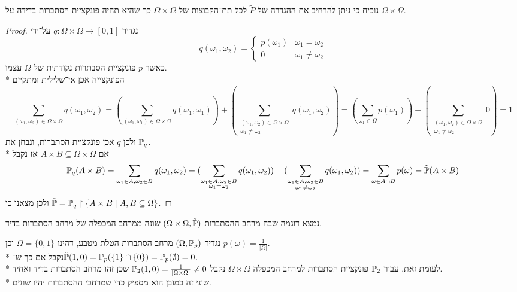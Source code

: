 \Subquestion{}
נוכיח כי ניתן להרחיב את ההגדרה של $\tilde{P}$ לכל תת־הקבוצות של $\Omega \times \Omega$ כך שהיא תהיה פונקציית הסתברות בדידה על $\Omega \times \Omega$.
\begin{proof}
	נגדיר $q : \Omega \times \Omega \to [0, 1]$ על־ידי
	\[
		q(\omega_1, \omega_2) = \begin{cases}
			p(\omega_1) & \omega_1 = \omega_2 \\
			0 & \omega_1 \ne \omega_2
		\end{cases}
	\]
	כאשר $p$ פונקציית הסבתרות נקודתית של $\Omega$ עצמו. \\*
	הפונקצייה אכן אי־שלילית ומתקיים
	\[
		\sum_{(\omega_1, \omega_2) \in \Omega \times \Omega} q(\omega_1, \omega_2)
		= (\sum_{(\omega_1, \omega_1) \in \Omega \times \Omega} q(\omega_1, \omega_1)) + (\sum_{\substack{(\omega_1, \omega_2) \in \Omega \times \Omega \\ \omega_1 \ne \omega_2}} q(\omega_1, \omega_2))
		= (\sum_{\omega_1 \in \Omega} p(\omega_1)) + (\sum_{\substack{(\omega_1, \omega_2) \in \Omega \times \Omega \\ \omega_1 \ne \omega_2}} 0)
		= 1
	\]
	ולכן $q$ אכן פונקציית הסתברות, ונבחן את $\mathbb{P}_q$. \\*
	אם $A \times B \subseteq \Omega \times \Omega$ אז נקבל
	\[
		\mathbb{P}_q(A \times B)
		= \sum_{\omega_1 \in A, \omega_2 \in B} q(\omega_1, \omega_2)
		= (\sum_{\substack{\omega_1 \in A, \omega_2 \in B \\ \omega_1 = \omega_2}} q(\omega_1, \omega_2)) + (\sum_{\substack{\omega_1 \in A, \omega_2 \in B \\ \omega_1 \ne \omega_2}} q(\omega_1, \omega_2))
		= \sum_{\omega \in A \cap B} p(\omega)
		= \tilde{\mathbb{P}}(A \times B)
	\]
	ולכן מצאנו כי $\tilde{\mathbb{P}} = \mathbb{P}_q \upharpoonright \{ A \times B \mid A, B \subseteq \Omega \}$.
\end{proof}

\Subquestion{}
נמצא דוגמה שבה מרחב ההסתברות $(\Omega \times \Omega, \tilde{\mathbb{P}})$ שונה ממרחב המכפלה של מרחב הסתברות בדיד.
\begin{solution}
	נגדיר $(\Omega, \mathbb{P}_p)$ מרחב הסתברות הטלת מטבע, דהינו $\Omega = \{ 0, 1 \}$ וכן $p(\omega) = \frac{1}{|\Omega|}$. \\*
	נקבל אם כך ש־$\tilde{\mathbb{P}}(1, 0) = \mathbb{P}_p(\{ 1 \} \cap \{ 0 \}) = \mathbb{P}_p(\emptyset) = 0$. \\*
	לעומת זאת, עבור $\mathbb{P}_2$ פונקציית הסתברות למרחב המכפלה $\Omega \times \Omega$ נקבל $\mathbb{P}_2(1, 0) = \frac{1}{|\Omega \times \Omega|} \ne 0$ שכן זהו מרחב הסתברות בדיד ואחיד. \\*
	שוני זה כמובן הוא מספיק כדי שמרחבי ההסתברות יהיו שונים.
\end{solution}



